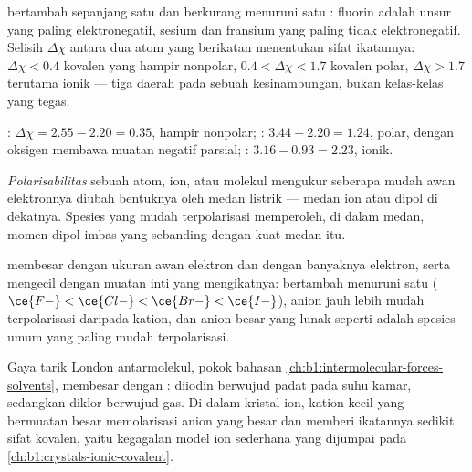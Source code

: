 \begin{proposition}\label{prop:b1:periodicity:en-trend}
 bertambah sepanjang satu  dan berkurang
menuruni satu : fluorin adalah unsur yang paling elektronegatif,
sesium dan fransium yang paling tidak elektronegatif. Selisih
$\Delta\chi$ antara dua atom yang berikatan menentukan sifat ikatannya:
$\Delta\chi < 0.4$ kovalen yang hampir nonpolar,
$0.4 < \Delta\chi < 1.7$ kovalen polar, $\Delta\chi > 1.7$ terutama
ionik --- tiga daerah pada sebuah kesinambungan, bukan kelas-kelas yang
tegas.
\end{proposition}

\begin{example}\label{ex:b1:periodicity:bonds}
: $\Delta\chi = 2.55 - 2.20 = 0.35$, hampir nonpolar;
: $3.44 - 2.20 = 1.24$, polar, dengan oksigen membawa muatan
negatif parsial; : $3.16 - 0.93 = 2.23$, ionik.
\end{example}

\begin{definition}[Polarisabilitas]\label{def:b1:periodicity:polarisability}
\emph{Polarisabilitas} sebuah atom, ion, atau
molekul mengukur seberapa mudah awan elektronnya diubah bentuknya oleh
medan listrik --- medan ion atau dipol di dekatnya. Spesies yang mudah
terpolarisasi memperoleh, di dalam medan, momen dipol imbas yang
sebanding dengan kuat medan itu.
\end{definition}

\begin{proposition}\label{prop:b1:periodicity:polarisability-trend}
 membesar dengan ukuran awan elektron dan dengan
banyaknya elektron, serta mengecil dengan muatan inti yang mengikatnya:
 bertambah menuruni satu  ($\ce{F-} < \ce{Cl-} < \ce{Br-} <
\ce{I-}$), anion jauh lebih mudah terpolarisasi daripada
kation, dan anion besar yang lunak seperti  adalah spesies umum
yang paling mudah terpolarisasi.
\end{proposition}

\begin{example}\label{ex:b1:periodicity:pol}
Gaya tarik London antarmolekul, pokok bahasan
\cref{ch:b1:intermolecular-forces-solvents}, membesar dengan
: diiodin berwujud padat pada suhu kamar, sedangkan
diklor berwujud gas. Di dalam kristal ion, kation kecil yang bermuatan
besar memolarisasi anion yang besar dan memberi ikatannya sedikit sifat
kovalen, yaitu kegagalan model ion sederhana yang dijumpai pada
\cref{ch:b1:crystals-ionic-covalent}.
\end{example}


